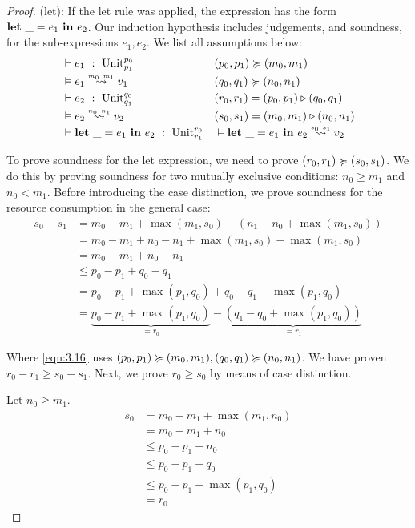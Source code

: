 \begin{proof}
   (let):  If the let rule was applied, the expression has the form \(\mathbf{let}~\_ = e_1~\mathbf{in}~e_2\). Our induction hypothesis includes judgements, and soundness, for the sub-expressions \(e_1, e_2\). We list all assumptions below:
   \begin{align*}
      &\typing{}{e_1}{\ratype{\unit}{p_0}{p_1}}                   & &(p_0, p_1)\relaxation (m_0, m_1)\\
      &\evals{}{e_1}{v_1}{m_0}{m_1}                               & &(q_0, q_1)\relaxation (n_0, n_1)\\
      &\typing{}{e_2}{\ratype{\unit}{q_0}{q_1}}                   & &(r_0, r_1) = (p_0, p_1) \sequence (q_0, q_1)\\
      &\evals{}{e_2}{v_2}{n_0}{n_1}                               & &(s_0, s_1) = (m_0, m_1) \sequence (n_0, n_1)\\
      &\typing{}{\letexp{\_}{e_1}{e_2}}{\ratype{\unit}{r_0}{r_1}} & &\evals{}{\letexp{\_}{e_1}{e_2}}{v_2}{s_0}{s_1}
   \end{align*}
   
   To prove soundness for the let expression, we need to prove \((r_0, r_1) \succcurlyeq (s_0, s_1)\). We do this by proving soundness for two mutually exclusive conditions: \(n_0 \geq m_1\) and \(n_0 < m_1\). Before introducing the case distinction, we prove soundness for the resource consumption in the general case:
   \begin{align}
      s_0 - s_1   &= m_0 - m_1 + \max(m_1, s_0) - (n_1 - n_0 + \max(m_1, s_0)) \\
                  &= m_0 - m_1 + n_0 - n_1 + \max(m_1, s_0) - \max(m_1, s_0) \\
                  &= m_0 - m_1 + n_0 - n_1 \\
                  &\leq p_0 - p_1 + q_0 - q_1 \label{eqn:3.16}\\
                  &= p_0 - p_1 + \max(p_1, q_0) + q_0 - q_1 - \max(p_1, q_0) \\
                  &= \underbrace{p_0 - p_1 + \max(p_1, q_0)}_{= r_0} - \underbrace{(q_1 - q_0 + \max(p_1, q_0))}_{= r_1}
   \end{align}

   Where \cref{eqn:3.16} uses \((p_0, p_1) \succcurlyeq (m_0, m_1), (q_0, q_1) \succcurlyeq (n_0, n_1)\). We have proven \(r_0 - r_1 \geq s_0 - s_1\). Next, we prove \(r_0 \geq s_0\) by means of case distinction. 
   
   Let \(n_0 \geq m_1\).
   \begin{align}
      s_0   &= m_0 - m_1 + \max(m_1, n_0) \\
            &= m_0 - m_1 + n_0 \\
            &\leq p_0 - p_1 + n_0 \label{eqn:3.9}\\
            &\leq p_0 - p_1 + q_0 \label{eqn:3.10}\\
            &\leq p_0 - p_1 + \max(p_1, q_0) \\
            &= r_0
   \end{align}
   

\end{proof}
